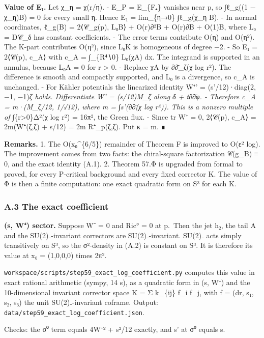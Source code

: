\documentclass[
  10pt,
]{report}
\begin{document}
\textbf{Value of E₁.} Let χ\_η = χ(r/η). - E\_P = E\_\{F₊\} vanishes
near p, so ∫ℓ\_g((1 − χ\_η)B) = 0 for every small η. Hence E₁ =
lim\_\{η→0\} ∫ℓ\_g(χ\_η B). - In normal coordinates, ℓ\_g(B) =
2⟨𝒞\_g(p), L₀B⟩ + O(r)∂²B + O(r)∂B + O(1)B, where L₀ = D𝒞\_δ has
constant coefficients. - The error terms contribute O(η) and O(η²). The
K-part contributes O(η²), since L₀K is homogeneous of degree −2. - So E₁
= 2⟨𝒞(p), c\_A⟩ with c\_A = ∫\_\{R⁴∖0\} L₀(χA) dx. The integrand is
supported in an annulus, because L₀A = 0 for r \textgreater{} 0. -
Replace χA by ∂∂̄\_ζ(χ log r²). The difference is smooth and compactly
supported, and L₀ is a divergence, so c\_A is unchanged. - For Kähler
potentials the linearized identity W⁺' = (s'/12)·diag(2, −1, −1)\emph{ζ
holds. Differentiate W⁺ = (s/12)M\_ζ along δ + t∂∂̄φ. - Therefore c\_A =
m·(M\_ζ/12, 1/√12), where m = ∫s'(∂∂̄(χ log r²)). This is a nonzero
multiple of ∫}\{r\textgreater0\}Δ²(χ log r²) = 16π², the Green flux. -
Since tr W⁺ = 0, 2⟨𝒞(p), c\_A⟩ = 2m(W⁺(ζ,ζ) + s/12) = 2m R⁺\_p(ζ,ζ). Put
κ = m. ∎

\textbf{Remarks.} 1. The O(x₀\^{}\{6/5\}) remainder of Theorem F is
improved to O(ε² log). The improvement comes from two facts: the
chiral-square factorization 𝒞(g\_B) ≡ 0, and the exact identity (A.1).
2. Theorem 57.Φ is upgraded from formal to proved, for every P-critical
background and every fixed corrector K. The value of Φ is then a finite
computation: one exact quadratic form on S³ for each K.

\hypertarget{a.3-the-exact-coefficient}{%
\subsubsection{A.3 The exact
coefficient}\label{a.3-the-exact-coefficient}}

\textbf{(s, W⁺) sector.} Suppose W⁻ = 0 and Ric° = 0 at p.~Then the jet
h₂, the tail A and the SU(2)₋-invariant correctors are SU(2)₋-invariant.
SU(2)₋ acts simply transitively on S³, so the σ²-density in (A.2) is
constant on S³. It is therefore its value at x₀ = (1,0,0,0) times 2π².

\texttt{workspace/scripts/step59\_exact\_log\_coefficient.py} computes
this value in exact rational arithmetic (sympy, 14 s), as a quadratic
form in (s, W⁺) and the 10-dimensional invariant corrector space K = Σ
k\_\{ij\} f\_i f\_j, with f = (dr, s₁, s₂, s₃) the unit SU(2)₋-invariant
coframe. Output: \texttt{data/step59\_exact\_log\_coefficient.json}.

Checks: the σ⁰ term equals 4\textbar W⁺\textbar² + s²/12 exactly, and s'
at σ⁰ equals s.
\end{document}
